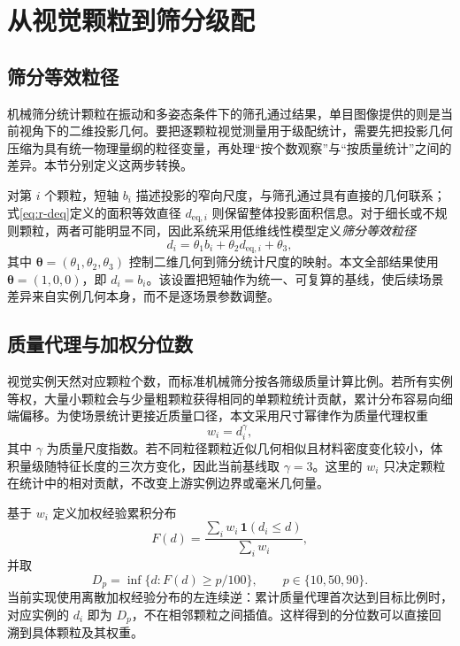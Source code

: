 \section{从视觉颗粒到筛分级配}
\label{sec:r-sieve-final}

\subsection{筛分等效粒径}

机械筛分统计颗粒在振动和多姿态条件下的筛孔通过结果，单目图像提供的则是当前视角下的二维投影几何。要把逐颗粒视觉测量用于级配统计，需要先把投影几何压缩为具有统一物理量纲的粒径变量，再处理“按个数观察”与“按质量统计”之间的差异。本节分别定义这两步转换。

对第 $i$ 个颗粒，短轴 $b_i$ 描述投影的窄向尺度，与筛孔通过具有直接的几何联系；式\eqref{eq:r-deq}定义的面积等效直径 $d_{\mathrm{eq},i}$ 则保留整体投影面积信息。对于细长或不规则颗粒，两者可能明显不同，因此系统采用低维线性模型定义\emph{筛分等效粒径}
\begin{equation}
 d_i=\theta_1 b_i+\theta_2 d_{\mathrm{eq},i}+\theta_3,
\label{eq:r-final-sieve-d}
\end{equation}
其中 $\boldsymbol{\theta}=(\theta_1,\theta_2,\theta_3)$ 控制二维几何到筛分统计尺度的映射。本文全部结果使用 $\boldsymbol{\theta}=(1,0,0)$，即 $d_i=b_i$。该设置把短轴作为统一、可复算的基线，使后续场景差异来自实例几何本身，而不是逐场景参数调整。

\subsection{质量代理与加权分位数}

视觉实例天然对应颗粒个数，而标准机械筛分按各筛级质量计算比例。若所有实例等权，大量小颗粒会与少量粗颗粒获得相同的单颗粒统计贡献，累计分布容易向细端偏移。为使场景统计更接近质量口径，本文采用尺寸幂律作为质量代理权重
\begin{equation}
 w_i=d_i^{\gamma},
\label{eq:r-final-mass}
\end{equation}
其中 $\gamma$ 为质量尺度指数。若不同粒径颗粒近似几何相似且材料密度变化较小，体积量级随特征长度的三次方变化，因此当前基线取 $\gamma=3$。这里的 $w_i$ 只决定颗粒在统计中的相对贡献，不改变上游实例边界或毫米几何量。

基于 $w_i$ 定义加权经验累积分布
\begin{equation}
 F(d)=\frac{\sum_i w_i\,\mathbf{1}(d_i\le d)}{\sum_i w_i},
\label{eq:r-final-cdf}
\end{equation}
并取
\begin{equation}
 D_p=\inf\{d:F(d)\ge p/100\},\qquad p\in\{10,50,90\}.
\label{eq:r-final-dp}
\end{equation}
当前实现使用离散加权经验分布的左连续逆：累计质量代理首次达到目标比例时，对应实例的 $d_i$ 即为 $D_p$，不在相邻颗粒之间插值。这样得到的分位数可以直接回溯到具体颗粒及其权重。

